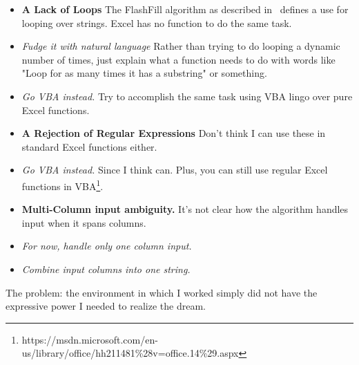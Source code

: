 \documentclass[11pt]{article} \usepackage{cite} \usepackage{marginnote}
\begin{document}
	\begin{itemize}
		\item[P1] \textbf{A Lack of Loops} The FlashFill algorithm as described in~\cite{gulwani2011automating} defines a use for looping over strings.
		Excel has no function to do the same task.
		
		\item[S1.1] \textit{Fudge it with natural language} Rather than trying
		to do looping a dynamic number of times, just explain what a function
		needs to do with words like "Loop for as many times it has a substring"
		or something.
		
		\item[S1.2] \textit{Go VBA instead.} Try to accomplish the same task
		using VBA lingo over pure Excel functions.
		
		\item[P2] \textbf{A Rejection of Regular Expressions} Don't think I can use these in standard Excel functions either.
		
		\item[S2.1] \textit{Go VBA instead.} Since I think can. Plus, you can still
		use regular Excel functions in VBA\footnote{https://msdn.microsoft.com/en-us/library/office/hh211481\%28v=office.14\%29.aspx}.
		
		\item[P3] \textbf{Multi-Column input ambiguity.} It's not clear how the algorithm
		handles input when it spans columns.
		
		\item[S3.1] \textit{For now, handle only one column input.}
		
		\item[S3.2] \textit{Combine input columns into one string.}
	\end{itemize}
	
	The problem: the environment in which I worked simply did not have the
	expressive power I needed to realize the dream.
	
	{} 
	
\end{document}

